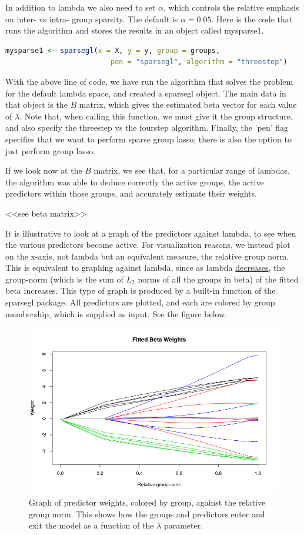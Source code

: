 \documentclass[titlepage]{article}
\begin{document}
In addition to lambda we also need to set $\alpha$, which controls the relative emphasis on inter- vs intra- group sparsity. The default is $\alpha = 0.05$. Here is the code that runs the algorithm and stores the results in an object called mysparse1.

\begin{lstlisting}[language=R]
mysparse1 <- sparsegl(x = X, y = y, group = groups,
                         pen = "sparsegl", algorithm = "threestep")
\end{lstlisting}
With the above line of code, we have run the algorithm that solves the problem for the default lambda space, and created a sparsegl object. The main data in that object is the $B$ matrix, which gives the estimated beta vector for each value of $\lambda$. Note that, when calling this function, we must give it the group structure, and also specify the threestep vs the fourstep algorithm. Finally, the 'pen' flag specifies that we want to perform sparse group lasso; there is also the option to just perform group lasso.

If we look now at the $B$ matrix, we see that, for a particular range of lambdas, the algorithm was able to deduce correctly the active groups, the active predictors within those groups, and accurately estimate their weights.

<<see beta matrix>>

It is illustrative to look at a graph of the predictors against lambda, to see when the various predictors become active. For visualization reasons, we instead plot on the x-axis, not lambda but an equivalent measure, the relative group norm. This is equivalent to graphing against lambda, since as lambda \underline{decreases}, the group-norm (which is the sum of $L_2$ norms of all the groups in beta) of the fitted beta increases. This type of graph is produced by a built-in function of the sparsegl package. All predictors are plotted, and each are colored by group membership, which is supplied as input. See the figure below.


\begin{figure}[tb!]
\centering
\includegraphics[scale=0.5]{fitted_beta_weights.png}
\caption{Graph of predictor weights, colored by group, against the relative group norm. This shows how the groups and predictors enter and exit the model as a function of the $\lambda$ parameter.}
\label{fig:colorWeights}
\end{figure}
\end{document}
